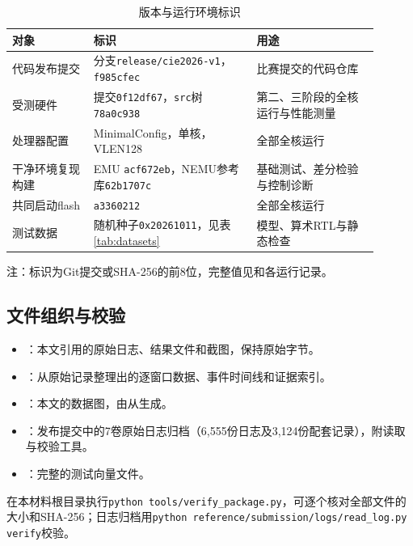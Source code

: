 \begin{table}[!htbp]\centering\small
\caption{版本与运行环境标识}\label{tab:versions}
\begin{tabular}{>{\raggedright\arraybackslash}p{0.20\linewidth}>{\raggedright\arraybackslash}p{0.40\linewidth}>{\raggedright\arraybackslash}p{0.30\linewidth}}
\toprule
对象 & 标识 & 用途\\
\midrule
代码发布提交 & 分支\texttt{release/cie2026-v1}，\texttt{f985cfec} & 比赛提交的代码仓库\\
受测硬件 & 提交\texttt{0f12df67}，\texttt{src}树\texttt{78a0c938} & 第二、三阶段的全核运行与性能测量\\
处理器配置 & MinimalConfig，单核，VLEN128 & 全部全核运行\\
干净环境复现构建 & EMU \texttt{acf672eb}，NEMU参考库\texttt{62b1707c} & 基础测试、差分检验与控制诊断\\
共同启动flash & \texttt{a3360212} & 全部全核运行\\
测试数据 & 随机种子\texttt{0x20261011}，见表\ref{tab:datasets} & 模型、算术RTL与静态检查\\
\bottomrule
\end{tabular}
\par\smallskip
{\footnotesize 注：标识为Git提交或SHA-256的前8位，完整值见和各运行记录。}
\end{table}

\subsection{文件组织与校验}

\begin{itemize}
\item {}：本文引用的原始日志、结果文件和截图，保持原始字节。
\item {}：从原始记录整理出的逐窗口数据、事件时间线和证据索引。
\item {}：本文的数据图，由从生成。
\item {}：发布提交中的7卷原始日志归档（6,555份日志及3,124份配套记录），附读取与校验工具。
\item {}：完整的测试向量文件。
\end{itemize}

在本材料根目录执行\texttt{python tools/verify\_package.py}，可逐个核对全部文件的大小和SHA-256；日志归档用\texttt{python reference/submission/logs/read\_log.py verify}校验。


